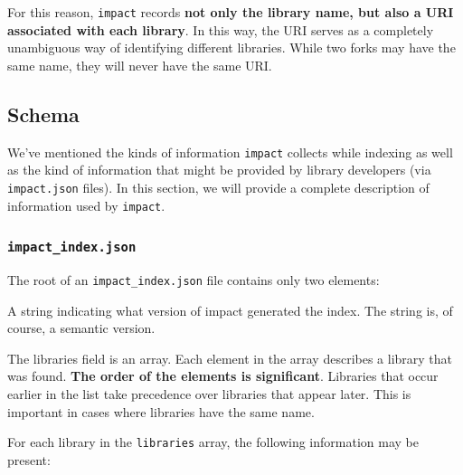 \documentclass[11pt,a4paper,twocolumn]{article}
\newcommand{\code}[1]{\texttt{#1}} %
\begin{document}
For this reason, \code{impact} records \textbf{not only the library name,
  but also a URI associated with each library}.  In this way, the URI
serves as a completely unambiguous way of identifying different
libraries.  While two forks may have the same name, they will never
have the same URI\@.

\subsection{Schema}

We've mentioned the kinds of information \code{impact} collects while
indexing as well as the kind of information that might be provided by
library developers (via \code{impact.json} files).  In this section,
we will provide a complete description of information used by
\code{impact}.

\subsubsection{\code{impact\_index.json}}
\label{sec:index_schema}

The root of an \code{impact\_index.json} file contains only two
elements:

\begin{description}[noitemsep]
  \item[\code{version}] A string indicating what version of impact
    generated the index.  The string is, of course, a semantic
    version.
  \item[\code{libraries}] The libraries field is an array.  Each
    element in the array describes a library that was found.  \textbf{The
      order of the elements is significant}.  Libraries that occur
    earlier in the list take precedence over libraries that appear
    later.  This is important in cases where libraries have the same
    name.
\end{description}

For each library in the \code{libraries} array, the following
information may be present:
\end{document}
